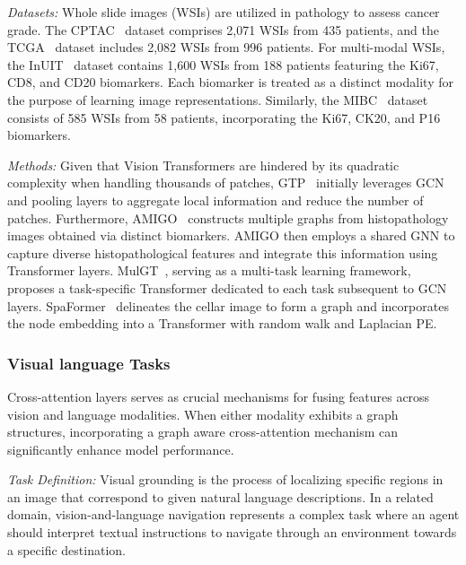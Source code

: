 \textit{Datasets:} Whole slide images (WSIs) are utilized in pathology to assess cancer grade. The CPTAC~\cite{edwards2015cptac} dataset comprises 2,071 WSIs from 435 patients, and the TCGA~\cite{tomczak2015review} dataset includes 2,082 WSIs from 996 patients. For multi-modal WSIs, the InUIT~\cite{nakhli2023sparse} dataset contains 1,600 WSIs from 188 patients featuring the Ki67, CD8, and CD20 biomarkers. Each biomarker is treated as a distinct modality for the purpose of learning image representations. Similarly, the MIBC~\cite{mi2021predictive} dataset consists of 585 WSIs from 58 patients, incorporating the Ki67, CK20, and P16 biomarkers.



\textit{Methods:} Given that Vision Transformers are hindered by its quadratic complexity when handling thousands of patches, GTP~\cite{zheng2022graph} initially leverages GCN and pooling layers to aggregate local information and reduce the number of patches. Furthermore, AMIGO~\cite{nakhli2023sparse} constructs multiple graphs from histopathology images obtained via distinct biomarkers. AMIGO then employs a shared GNN to capture diverse histopathological features and integrate this information using Transformer layers.
MulGT~\cite{zhao2023mulgt}, serving as a multi-task learning framework, proposes a task-specific Transformer dedicated to each task subsequent to GCN layers. SpaFormer~\cite{wen2023single} delineates the cellar image to form a graph and incorporates the node embedding into a Transformer with random walk and Laplacian PE.

\subsubsection{\textbf{Visual language Tasks}}
Cross-attention layers serves as crucial mechanisms for fusing features across vision and language modalities.
When either modality exhibits a graph structures, incorporating a graph aware cross-attention mechanism can significantly enhance model performance.

\textit{Task Definition: }
Visual grounding is the process of localizing specific regions in an image that correspond to given natural language descriptions. In a related domain, vision-and-language navigation represents a complex task where an agent should interpret textual instructions to navigate through an environment towards a specific destination. 

